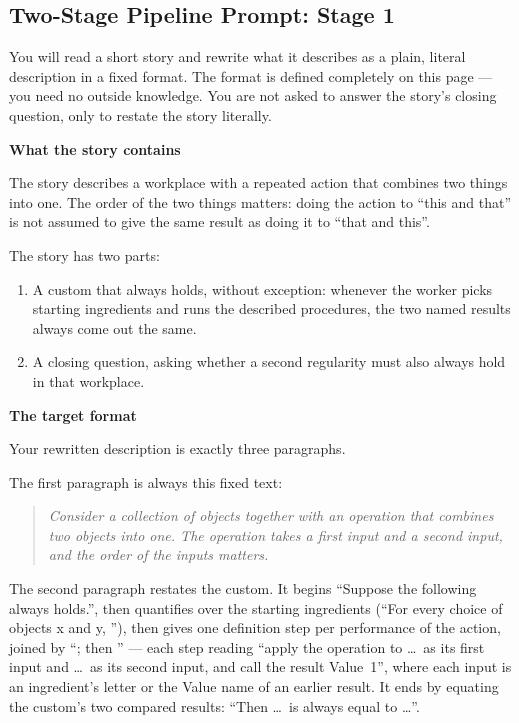 \documentclass{article}
\begin{document}
\subsection{Two-Stage Pipeline Prompt: Stage 1}
\begin{promptbox}
\footnotesize
\raggedright

You will read a short story and rewrite what it describes as a plain,
literal description in a fixed format. The format is defined completely on
this page --- you need no outside knowledge. You are not asked to answer the
story's closing question, only to restate the story literally.

\vspace{0.6em}
\noindent\textbf{What the story contains}

The story describes a workplace with a repeated action that combines two
things into one. The order of the two things matters: doing the action to
``this and that'' is not assumed to give the same result as doing it to
``that and this''.

The story has two parts:
\begin{enumerate}
  \item A custom that always holds, without exception: whenever the worker
    picks starting ingredients and runs the described procedures, the two
    named results always come out the same.
  \item A closing question, asking whether a second regularity must also
    always hold in that workplace.
\end{enumerate}

\vspace{0.4em}
\noindent\textbf{The target format}

Your rewritten description is exactly three paragraphs.

The first paragraph is always this fixed text:
\begin{quote}\itshape
Consider a collection of objects together with an operation that combines
two objects into one. The operation takes a first input and a second
input, and the order of the inputs matters.
\end{quote}

The second paragraph restates the custom. It begins ``Suppose the following
always holds.'', then quantifies over the starting ingredients (``For every
choice of objects x and y, ''), then gives one definition step per
performance of the action, joined by ``; then '' --- each step reading
``apply the operation to \ldots\ as its first input and \ldots\ as its
second input, and call the result Value~1'', where each input is an
ingredient's letter or the Value name of an earlier result. It ends by
equating the custom's two compared results: ``Then \ldots\ is always equal
to \ldots''.


\end{promptbox}
\end{document}
